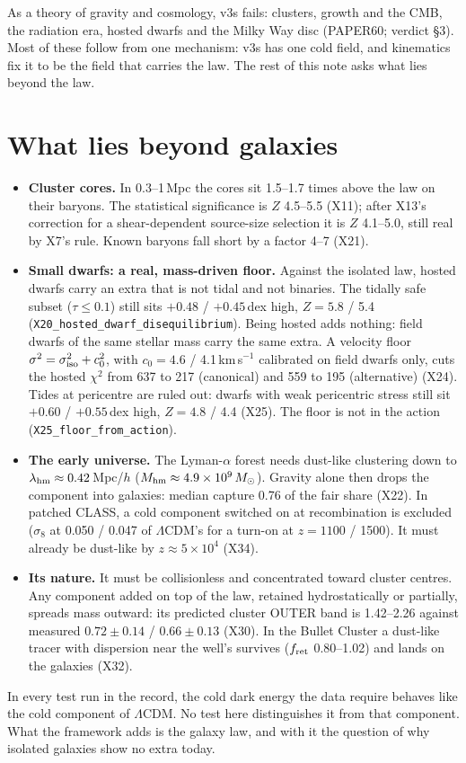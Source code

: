 \documentclass[10pt]{article}
\begin{document}
As a theory of gravity and cosmology, v3s fails: clusters, growth and the CMB, the radiation era, hosted dwarfs and the Milky Way disc (PAPER60; verdict \S3). Most of these follow from one mechanism: v3s has one cold field, and kinematics fix it to be the field that carries the law. The rest of this note asks what lies beyond the law.

\section{What lies beyond galaxies}
\begin{itemize}
\item \textbf{Cluster cores.} In 0.3--1\,Mpc the cores sit 1.5--1.7 times above the law on their baryons. The statistical significance is $Z$ 4.5--5.5 (X11); after X13's correction for a shear-dependent source-size selection it is $Z$ 4.1--5.0, still real by X7's rule. Known baryons fall short by a factor 4--7 (X21).
\item \textbf{Small dwarfs: a real, mass-driven floor.} Against the isolated law, hosted dwarfs carry an extra that is not tidal and not binaries. The tidally safe subset ($\tau\le0.1$) still sits $+0.48$ / $+0.45$\,dex high, $Z=5.8$ / 5.4 (\texttt{X20\_hosted\_dwarf\_disequilibrium}). Being hosted adds nothing: field dwarfs of the same stellar mass carry the same extra. A velocity floor $\sigma^2=\sigma_{\rm iso}^2+c_0^2$, with $c_0=4.6$ / 4.1\,km\,s$^{-1}$ calibrated on field dwarfs only, cuts the hosted $\chi^2$ from 637 to 217 (canonical) and 559 to 195 (alternative) (X24). Tides at pericentre are ruled out: dwarfs with weak pericentric stress still sit $+0.60$ / $+0.55$\,dex high, $Z=4.8$ / 4.4 (X25). The floor is not in the action (\texttt{X25\_floor\_from\_action}).
\item \textbf{The early universe.} The Lyman-$\alpha$ forest needs dust-like clustering down to $\lambda_{\rm hm}\approx0.42$\,Mpc/$h$ ($M_{\rm hm}\approx4.9\times10^{9}\,M_\odot$). Gravity alone then drops the component into galaxies: median capture 0.76 of the fair share (X22). In patched CLASS, a cold component switched on at recombination is excluded ($\sigma_8$ at 0.050 / 0.047 of $\Lambda$CDM's for a turn-on at $z=1100$ / 1500). It must already be dust-like by $z\approx5\times10^4$ (X34).
\item \textbf{Its nature.} It must be collisionless and concentrated toward cluster centres. Any component added on top of the law, retained hydrostatically or partially, spreads mass outward: its predicted cluster OUTER band is 1.42--2.26 against measured $0.72\pm0.14$ / $0.66\pm0.13$ (X30). In the Bullet Cluster a dust-like tracer with dispersion near the well's survives ($f_{\rm ret}$ 0.80--1.02) and lands on the galaxies (X32).
\end{itemize}
In every test run in the record, the cold dark energy the data require behaves like the cold component of $\Lambda$CDM. No test here distinguishes it from that component. What the framework adds is the galaxy law, and with it the question of why isolated galaxies show no extra today.
\end{document}

